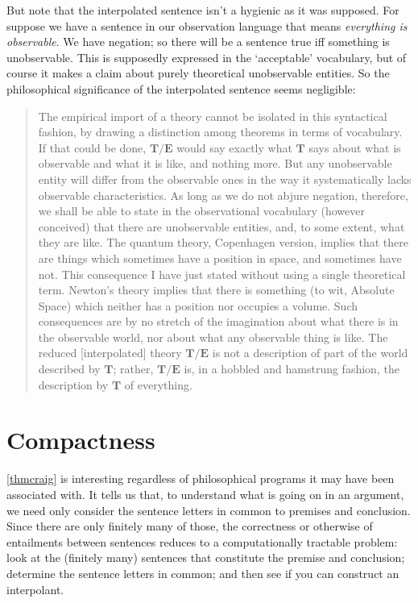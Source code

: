 But note that the interpolated sentence isn't a hygienic as it was supposed. For suppose we have a sentence in our observation language that means \emph{everything is observable}. We have negation; so there will be a sentence true iff something is unobservable. This is supposedly expressed in the `acceptable' vocabulary, but of course it makes a claim about purely theoretical unobservable entities. So the philosophical significance of the interpolated sentence seems negligible: \begin{quote}
	The empirical import of a theory cannot be isolated in this syntactical fashion, by drawing a distinction among theorems in terms of vocabulary. If that could be done, $\mathbf{T}/\mathbf{E}$ would say exactly what $\mathbf{T}$ says about what is observable and what it is like, and nothing more. But any unobservable entity will differ from the observable ones in the way it systematically lacks observable characteristics. As long as we do not abjure negation, therefore, we shall be able to state in the observational vocabulary (however conceived) that there are unobservable entities, and, to some extent, what they are like. The quantum theory, Copenhagen version, implies that there are things which sometimes have a position in space, and sometimes have not. This consequence I have just stated without using a single theoretical term. Newton's theory implies that there is something (to wit, Absolute Space) which neither has a position nor occupies a volume. Such consequences are by no stretch of the imagination about what there is in the observable world, nor about what any observable thing is like. The reduced [interpolated] theory $\mathbf{T}/\mathbf{E}$ is not a description of part of the world described by $\mathbf{T}$; rather, $\mathbf{T}/\mathbf{E}$ is, in a hobbled and hamstrung fashion, the description by $\mathbf{T}$ of everything.~\citep[54–5]{bvfsi}
\end{quote}

\section{Compactness}

\autoref{thmcraig} is interesting regardless of philosophical programs it may have been associated with. It tells us that, to understand what is going on in an argument, we need only consider the sentence letters in common to premises and conclusion. Since there are only finitely many of those, the correctness or otherwise of entailments between sentences reduces to a computationally tractable problem: look at the (finitely many) sentences that constitute the premise and conclusion; determine the sentence letters in common; and then see if you can construct an interpolant.

